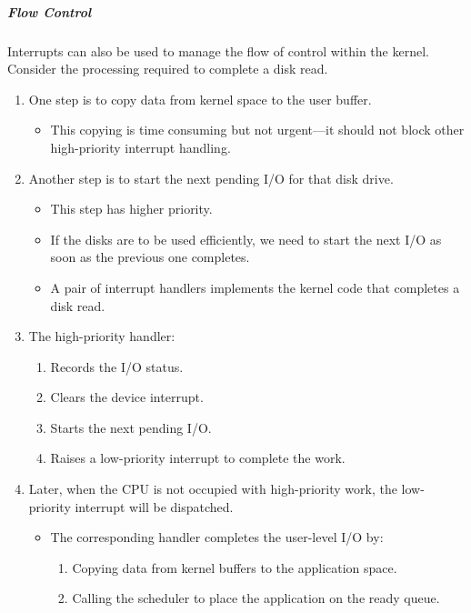 \subparagraph{Flow Control}\label{subpar:Flow_Control_Interrupts}
Interrupts can also be used to manage the flow of control within the kernel.
Consider the processing required to complete a disk read.
\begin{enumerate}[noitemsep]
\item One step is to copy data from kernel space to the user buffer.
  \begin{itemize}[noitemsep]
  \item This copying is time consuming but not urgent—it should not block other high-priority interrupt handling.
  \end{itemize}

\item Another step is to start the next pending I/O for that disk drive.
  \begin{itemize}[noitemsep]
  \item This step has higher priority.
  \item If the disks are to be used efficiently, we need to start the next I/O as soon as the previous one completes.
  \item A pair of interrupt handlers implements the kernel code that completes a disk read.
  \end{itemize}

\item The high-priority handler:
  \begin{enumerate}[noitemsep]
  \item Records the I/O status.
  \item Clears the device interrupt.
  \item Starts the next pending I/O.
  \item Raises a low-priority interrupt to complete the work.
  \end{enumerate}

\item Later, when the CPU is not occupied with high-priority work, the low-priority interrupt will be dispatched.
  \begin{itemize}[noitemsep]
  \item The corresponding handler completes the user-level I/O by:
    \begin{enumerate}[noitemsep]
    \item Copying data from kernel buffers to the application space.
    \item Calling the scheduler to place the application on the ready queue.
    \end{enumerate}
  \end{itemize}
\end{enumerate}

